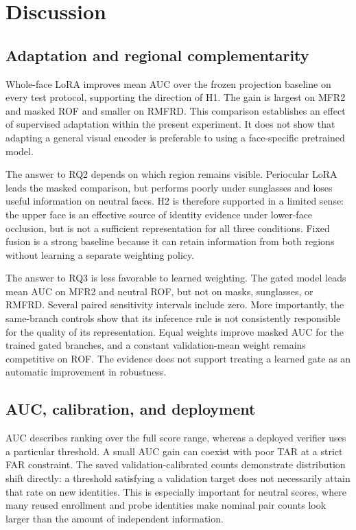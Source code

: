 \documentclass[12pt,a4paper,oneside]{report}
\begin{document}
\chapter{Discussion}
\section{Adaptation and regional complementarity}
Whole-face LoRA improves mean AUC over the frozen projection baseline on every test protocol, supporting the direction of H1. The gain is largest on MFR2 and masked ROF and smaller on RMFRD. This comparison establishes an effect of supervised adaptation within the present experiment. It does not show that adapting a general visual encoder is preferable to using a face-specific pretrained model.

The answer to RQ2 depends on which region remains visible. Periocular LoRA leads the masked comparison, but performs poorly under sunglasses and loses useful information on neutral faces. H2 is therefore supported in a limited sense: the upper face is an effective source of identity evidence under lower-face occlusion, but is not a sufficient representation for all three conditions. Fixed fusion is a strong baseline because it can retain information from both regions without learning a separate weighting policy.

The answer to RQ3 is less favorable to learned weighting. The gated model leads mean AUC on MFR2 and neutral ROF, but not on masks, sunglasses, or RMFRD. Several paired sensitivity intervals include zero. More importantly, the same-branch controls show that its inference rule is not consistently responsible for the quality of its representation. Equal weights improve masked AUC for the trained gated branches, and a constant validation-mean weight remains competitive on ROF. The evidence does not support treating a learned gate as an automatic improvement in robustness.

\section{AUC, calibration, and deployment}
AUC describes ranking over the full score range, whereas a deployed verifier uses a particular threshold. A small AUC gain can coexist with poor TAR at a strict FAR constraint. The saved validation-calibrated counts demonstrate distribution shift directly: a threshold satisfying a validation target does not necessarily attain that rate on new identities. This is especially important for neutral scores, where many reused enrollment and probe identities make nominal pair counts look larger than the amount of independent information.
\end{document}
